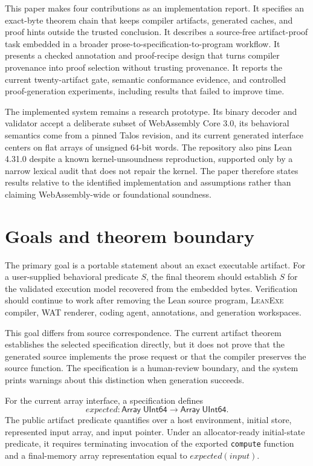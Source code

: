 \documentclass[11pt]{article}
\newcommand{\leanexe}{\textsc{LeanExe}}
\newcommand{\code}[1]{\texttt{#1}}
\begin{document}
This paper makes four contributions as an implementation report.  It specifies an exact-byte theorem chain that keeps compiler artifacts, generated caches, and proof hints outside the trusted conclusion.  It describes a source-free artifact-proof task embedded in a broader prose-to-specification-to-program workflow.  It presents a checked annotation and proof-recipe design that turns compiler provenance into proof selection without trusting provenance.  It reports the current twenty-artifact gate, semantic conformance evidence, and controlled proof-generation experiments, including results that failed to improve time.

The implemented system remains a research prototype.  Its binary decoder and validator accept a deliberate subset of WebAssembly Core 3.0, its behavioral semantics come from a pinned Talos revision, and its current generated interface centers on flat arrays of unsigned 64-bit words.  The repository also pins Lean 4.31.0 despite a known kernel-unsoundness reproduction, supported only by a narrow lexical audit that does not repair the kernel.  The paper therefore states results relative to the identified implementation and assumptions rather than claiming WebAssembly-wide or foundational soundness.

\section{Goals and theorem boundary}

The primary goal is a portable statement about an exact executable artifact.  For a user-supplied behavioral predicate $S$, the final theorem should establish $S$ for the validated execution model recovered from the embedded bytes.  Verification should continue to work after removing the Lean source program, \leanexe{} compiler, WAT renderer, coding agent, annotations, and generation workspaces.

This goal differs from source correspondence.  The current artifact theorem establishes the selected specification directly, but it does not prove that the generated source implements the prose request or that the compiler preserves the source function.  The specification is a human-review boundary, and the system prints warnings about this distinction when generation succeeds.

For the current array interface, a specification defines
\[
  \mathit{expected} : \mathsf{Array}\;\mathsf{UInt64}
      \rightarrow \mathsf{Array}\;\mathsf{UInt64}.
\]
The public artifact predicate quantifies over a host environment, initial store, represented input array, and input pointer.  Under an allocator-ready initial-state predicate, it requires terminating invocation of the exported \code{compute} function and a final-memory array representation equal to $\mathit{expected}(input)$.
\end{document}
